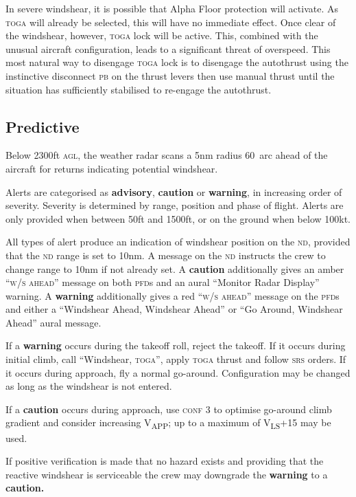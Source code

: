 \documentclass[a5paper,11pt,twoside]{book}
\newcommand{\ac}[1]{{\scshape\MakeLowercase{#1}}}
\newcommand{\cphrase}[1]{\ac{#1}}
\newcommand{\inlcite}[1]{{\ac{#1}}}
\newcommand{\multicite}[1]{%
  \nopagebreak
  \noindent{{\color{blue}\footnotesize[ \inlcite{#1} ]}}
}
\newcommand{\V}[1]{V\textsubscript{#1}}
\newcommand{\strong}[1]{\textbf{#1}}
\begin{document}
In severe windshear, it is possible that Alpha Floor protection will
activate. As \ac{TOGA} will already be selected, this will have no immediate
effect. Once clear of the windshear, however, \ac{TOGA} lock will be
active. This, combined with the unusual aircraft configuration, leads to a
significant threat of overspeed. This most natural way to disengage \ac{TOGA}
lock is to disengage the autothrust using the instinctive disconnect \ac{PB} on
the thrust levers then use manual thrust until the situation has sufficiently
stabilised to re-engage the autothrust.

\multicite{FCOM~PRO.AEP.SURV}

\subsection{Predictive}

Below 2300ft \ac{AGL}, the weather radar scans a 5nm radius 60\textdegree\ arc
ahead of the aircraft for returns indicating potential windshear.

Alerts are categorised as \strong{advisory}, \strong{caution} or
\strong{warning}, in increasing order of severity. Severity is determined by
range, position and phase of flight. Alerts are only provided when between 50ft
and 1500ft, or on the ground when below 100kt.

All types of alert produce an indication of windshear position on the \ac{ND},
provided that the \ac{ND} range is set to 10nm. A message on the \ac{ND}
instructs the crew to change range to 10nm if not already set. A
\strong{caution} additionally gives an amber ``\cphrase{W/S AHEAD}'' message on
both \ac{PFD}s and an aural ``Monitor Radar Display'' warning. A
\strong{warning} additionally gives a red ``\cphrase{W/S AHEAD}'' message on the
\ac{PFD}s and either a ``Windshear Ahead, Windshear Ahead'' or ``Go Around,
Windshear Ahead'' aural message.

If a \strong{warning} occurs during the takeoff roll, reject the takeoff. If it
occurs during initial climb, call ``Windshear, \ac{TOGA}'', apply \ac{TOGA}
thrust and follow \ac{SRS} orders. If it occurs during approach, fly a normal
go-around. Configuration may be changed as long as the windshear is not entered.

If a \strong{caution} occurs during approach, use \ac{CONF} 3 to optimise
go-around climb gradient and consider increasing \V{APP}; up to a maximum of
\V{LS}+15 may be used.

If positive verification is made that no hazard exists and providing that the
reactive windshear is serviceable the crew may downgrade the \strong{warning} to
a \strong{caution.}
\end{document}
